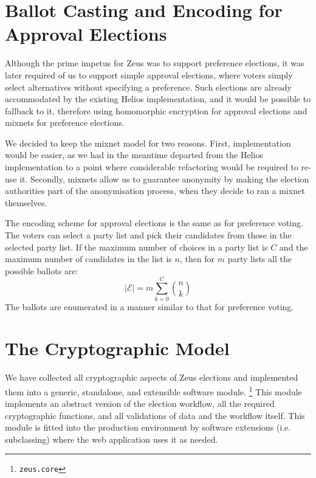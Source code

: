 \documentclass[letterpaper,twocolumn,10pt]{article}
\begin{document}

\section{Ballot Casting and Encoding for Approval Elections}

Although the prime impetus for Zeus was to support preference
elections, it was later required of us to support simple approval
elections, where voters simply select alternatives without specifying
a preference. Such elections are already accommodated by the existing
Helios implementation, and it would be possible to fallback to it,
therefore using homomorphic encryption for approval elections and
mixnets for preference elections.

We decided to keep the mixnet model for two reasons. First,
implementation would be easier, as we had in the meantime departed
from the Helios implementation to a point where considerable
refactoring would be required to re-use it. Secondly, mixnets allow us
to guarantee anonymity by making the election authorities part of the
anonymisation process, when they decide to ran a mixnet themselves.

The encoding scheme for approval elections is the same as for
preference voting. The voters can select a party list and pick their
candidates from those in the selected party list. If the maximum
number of choices in a party list is $C$ and the maximum number of
candidates in the list is $n$, then for $m$ party lists all the
possible ballots are:
\begin{equation}
\label{eq:max_encoded_approval}
|\mathcal{E}| = m\sum^{C}_{k=0}\binom{n}{k}
\end{equation}
The ballots are enumerated in a manner similar to that for preference
voting. 

\section{The Cryptographic Model}

We have collected all cryptographic aspects of Zeus elections and
implemented them into a generic, standalone, and extensible software
module. \footnote{\texttt{zeus.core}} This module implements an
abstract version of the election workflow, all the required
cryptographic functions, and all validations of data and the workflow
itself. This module is fitted into the production environment by
software extensions (i.e. subclassing) where the web application uses
it as needed.
\end{document}
